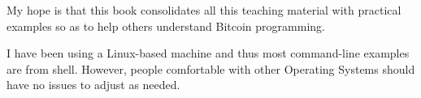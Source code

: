 My hope is that this book consolidates all this teaching material with practical examples so as to help others understand Bitcoin programming. 

I have been using a Linux-based machine and thus most command-line examples are from  shell. However, people comfortable with other Operating Systems should have no issues to adjust as needed.

